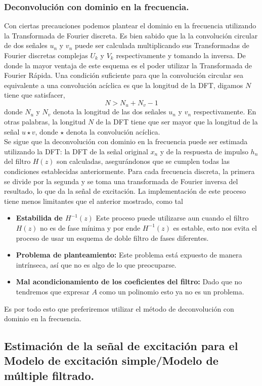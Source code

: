 \documentclass[11pt]{amsart}
\theoremstyle{plain}
\theoremstyle{definition}
\begin{document}
\subsubsection{Deconvolución con dominio en la frecuencia.}
Con ciertas precauciones podemos plantear el dominio en la frecuencia utilizando la Transformada de Fourier discreta. Es bien sabido que la la convolución circular de dos señales $u_n$ y $v_n$ puede ser calculada multiplicando sus Transformadas de Fourier discretas complejas $U_k$ y $V_k$ respectivamente y tomando la inversa. De donde la mayor ventaja de este esquema es el poder utilizar la Transformada de Fourier Rápida. Una condición suficiente para que la convolución circular sea equivalente a una convolución acíclica es que la longitud de la DFT, digamos $N$ tiene que satisfacer,
$$
N > N_u+N_v-1
$$
donde $N_u$ y $N_v$ denota la longitud de las dos señales $u_n$ y $v_n$ respectivamente. En otras palabras, la longitud $N$ de la DFT tiene que ser mayor que la longitud de la señal $u \star v$, donde $\star$ denota la convolución acíclica. \\ Se sigue que la deconvolución con dominio en la frecuencia puede ser estimada utilizando la DFT: la DFT de la señal original $x_n$ y de la respuesta de impulso $h_n$ del filtro $H(z)$ son calculadas, asegurándonos que se cumplen todas las condiciones establecidas anteriormente. 	Para cada frecuencia discreta, la primera se divide por la segunda y se toma una transformada de Fourier inversa del resultado, lo que da la señal de excitación. La implementación de este proceso tiene menos limitantes que el anterior mostrado, como tal
\begin{itemize}
\item \textbf{Estabilida de $H^{-1}(z)$} Este proceso puede utilizarse aun cuando el filtro $H(z)$ no es de fase mínima y por ende $H^{-1}(z)$ es estable, esto nos evita el proceso de usar un esquema de doble filtro de fases diferentes.
\item \textbf{Problema de planteamiento:} Este problema está expuesto de manera intrínseca, así que no es algo de lo que preocuparse.
\item \textbf{Mal acondicionamiento de los coeficientes del filtro:} Dado que no tendremos que expresar $A$ como un polinomio esto ya no es un problema.
\end{itemize}
Es por todo esto que preferiremos utilizar el método de deconvolución con dominio en la frecuencia.

\subsection{Estimación de la señal de excitación para el Modelo de excitación simple/Modelo de múltiple filtrado.}
\end{document}
